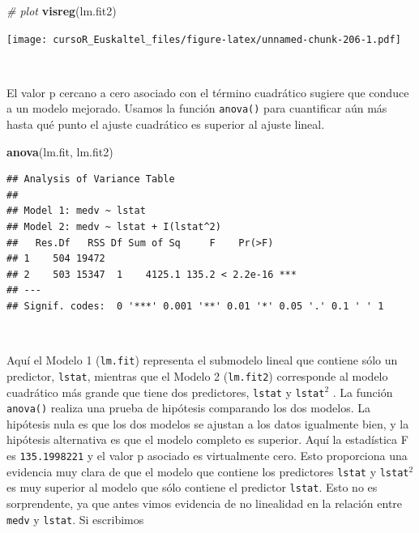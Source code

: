 \documentclass[]{book}
\newenvironment{Shaded}{\begin{snugshade}}{\end{snugshade}}
\newcommand{\KeywordTok}[1]{\textcolor[rgb]{0.13,0.29,0.53}{\textbf{#1}}}
\newcommand{\CommentTok}[1]{\textcolor[rgb]{0.56,0.35,0.01}{\textit{#1}}}
\newcommand{\NormalTok}[1]{#1}
\begin{document}
\begin{Shaded}
\begin{Highlighting}[]
\CommentTok{# plot}
\KeywordTok{visreg}\NormalTok{(lm.fit2)}
\end{Highlighting}
\end{Shaded}

\texttt{[image: cursoR\_Euskaltel\_files/figure-latex/unnamed-chunk-206-1.pdf]}

~

El valor p cercano a cero asociado con el término cuadrático sugiere que
conduce a un modelo mejorado. Usamos la función \texttt{anova()} para
cuantificar aún más hasta qué punto el ajuste cuadrático es superior al
ajuste lineal.

\begin{Shaded}
\begin{Highlighting}[]
\KeywordTok{anova}\NormalTok{(lm.fit, lm.fit2)}
\end{Highlighting}
\end{Shaded}

\begin{verbatim}
## Analysis of Variance Table
## 
## Model 1: medv ~ lstat
## Model 2: medv ~ lstat + I(lstat^2)
##   Res.Df   RSS Df Sum of Sq     F    Pr(>F)    
## 1    504 19472                                 
## 2    503 15347  1    4125.1 135.2 < 2.2e-16 ***
## ---
## Signif. codes:  0 '***' 0.001 '**' 0.01 '*' 0.05 '.' 0.1 ' ' 1
\end{verbatim}

~

Aquí el Modelo 1 (\texttt{lm.fit}) representa el submodelo lineal que
contiene sólo un predictor, \texttt{lstat}, mientras que el Modelo 2
(\texttt{lm.fit2}) corresponde al modelo cuadrático más grande que tiene
dos predictores, \texttt{lstat} y \texttt{lstat}\(^2\) . La función
\texttt{anova()} realiza una prueba de hipótesis comparando los dos
modelos. La hipótesis nula es que los dos modelos se ajustan a los datos
igualmente bien, y la hipótesis alternativa es que el modelo completo es
superior. Aquí la estadística F es \texttt{135.1998221} y el valor p
asociado es virtualmente cero. Esto proporciona una evidencia muy clara
de que el modelo que contiene los predictores \texttt{lstat} y
\texttt{lstat}\(^2\) es muy superior al modelo que sólo contiene el
predictor \texttt{lstat}. Esto no es sorprendente, ya que antes vimos
evidencia de no linealidad en la relación entre \texttt{medv} y
\texttt{lstat}. Si escribimos

~
\end{document}
